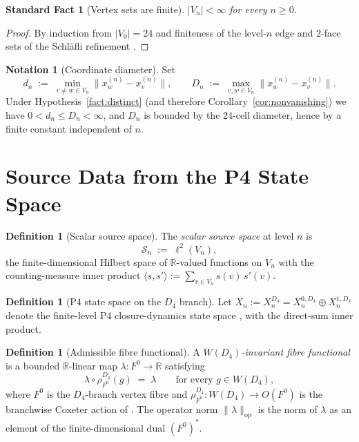 \documentclass[11pt, a4paper]{amsart}
\newtheorem{fact}[theorem]{Standard Fact}
\theoremstyle{definition}
\newtheorem{definition}[theorem]{Definition}
\newtheorem{notation}[theorem]{Notation}
\newcommand{\R}{\mathbb{R}}
\newcommand{\op}{\operatorname{op}}
\begin{document}
\begin{fact}[Vertex sets are finite]
\label{fact:finite}
$|V_n| < \infty$ for every $n \geq 0$.
\end{fact}

\begin{proof}
By induction from $|V_0| = 24$ and finiteness of the level-$n$
edge and $2$-face sets of the Schl\"{a}fli refinement
\cite[Prop.~2.6]{RefinementSpaces}.
\end{proof}

\begin{notation}[Coordinate diameter]
\label{not:diam}
Set
\[
  d_n \;:=\; \min_{v \neq w \in V_n}
    \|x_w^{(n)} - x_v^{(n)}\|, \qquad
  D_n \;:=\; \max_{v, w \in V_n}
    \|x_w^{(n)} - x_v^{(n)}\|.
\]
Under Hypothesis~\ref{fact:distinct} (and therefore
Corollary~\ref{cor:nonvanishing}) we have $0 < d_n \leq D_n <
\infty$, and $D_n$ is bounded by the $24$-cell diameter, hence by
a finite constant independent of $n$.
\end{notation}

\section{Source Data from the P4 State Space}
\label{sec:source}

\begin{definition}[Scalar source space]
\label{def:scalar-source}
The \emph{scalar source space} at level $n$ is
\[
  \mathcal S_n \;:=\; \ell^2(V_n),
\]
the finite-dimensional Hilbert space of $\R$-valued functions on
$V_n$ with the counting-measure inner product
$\langle s, s' \rangle := \sum_{v \in V_n} s(v)\,s'(v)$.
\end{definition}

\begin{definition}[P4 state space on the $D_4$ branch]
\label{def:p4-state}
Let $X_n := X_n^{D_4} = X_n^{0, D_4} \oplus X_n^{1, D_4}$ denote
the finite-level P4 closure-dynamics state space
\cite[Def.~2.1]{ClosureDynamics}, with the direct-sum inner
product.
\end{definition}

\begin{definition}[Admissible fibre functional]
\label{def:fibre-functional}
A \emph{$W(D_4)$-invariant fibre functional} is a bounded
$\R$-linear map $\lambda \colon F^0 \to \R$ satisfying
\[
  \lambda \circ \rho_{F^0}^{D_4}(g) \;=\; \lambda
  \qquad \text{for every } g \in W(D_4),
\]
where $F^0$ is the $D_4$-branch vertex fibre and
$\rho_{F^0}^{D_4} \colon W(D_4) \to O(F^0)$ is the branchwise
Coxeter action of \cite[Def.~8.1]{RefinementSpaces}. The
operator norm $\|\lambda\|_\op$ is the norm of $\lambda$ as an
element of the finite-dimensional dual $(F^0)^\ast$.
\end{definition}
\end{document}
